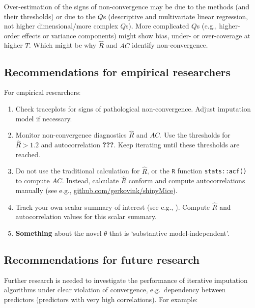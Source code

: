 \documentclass[Royal,times,sageh]{sagej}
\begin{document}
Over-estimation of the signs of non-convergence may be due to the methods (and their thresholds) or due to the \(Q\)s (descriptive and multivariate linear regression, not higher dimensional/more complex \(Q\)s). More complicated \(Q\)s (e.g., higher-order effects or variance components) might show bias, under- or over-coverage at higher \(T\). Which might be why \(\widehat{R}\) and \(AC\) identify non-convergence.

\hypertarget{recommendations-for-empirical-researchers}{%
\subsection{Recommendations for empirical researchers}\label{recommendations-for-empirical-researchers}}

For empirical researchers:

\begin{enumerate}
\def\labelenumi{\arabic{enumi}.}
\item
  Check traceplots for signs of pathological non-convergence. Adjust imputation model if necessary.
\item
  Monitor non-convergence diagnostics \(\widehat{R}\) and \(AC\). Use the thresholds for \(\widehat{R}>1.2\) and autocorrelation \textbf{???}. Keep iterating until these thresholds are reached.
\item
  Do not use the traditional calculation for \(\widehat{R}\), or the \texttt{R} function \texttt{stats::acf()} to compute \(AC\). Instead, calculate \(\widehat{R}\) conform \citet{veht19} and compute autocorrelations manually (see e.g., \href{https://github.com/gerkovink/shinyMice/tree/master/3.Thesis/1.SimulationStudy}{github.com/gerkovink/shinyMice}).
\item
  Track your own scalar summary of interest (see e.g., \citet{buur18}). Compute \(\widehat{R}\) and autocorrelation values for this scalar summary.
\item
  \textbf{Something} about the novel \(\theta\) that is `substantive model-independent'.
\end{enumerate}

\hypertarget{recommendations-for-future-research}{%
\subsection{Recommendations for future research}\label{recommendations-for-future-research}}

Further research is needed to investigate the performance of iterative imputation algorithms under clear violation of convergence, e.g.~dependency between predictors (predictors with very high correlations). For example:
\end{document}
